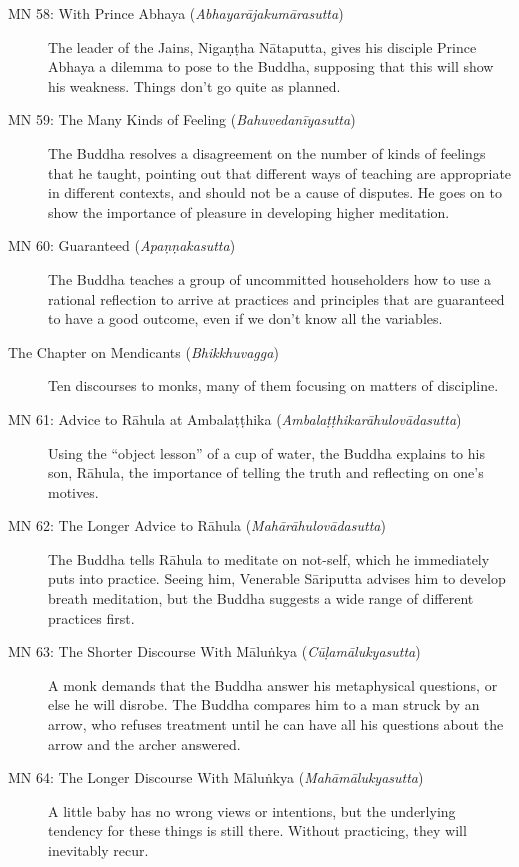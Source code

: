 \documentclass[12pt,openany]{book}%
\begin{document}
\begin{description}
\item[MN 58: With Prince Abhaya (\textit{\textsanskrit{Abhayarājakumārasutta}})] The leader of the Jains, \textsanskrit{Nigaṇṭha} \textsanskrit{Nātaputta}, gives his disciple Prince Abhaya a dilemma to pose to the Buddha, supposing that this will show his weakness. Things don’t go quite as planned.%
\item[MN 59: The Many Kinds of Feeling (\textit{\textsanskrit{Bahuvedanīyasutta}})] The Buddha resolves a disagreement on the number of kinds of feelings that he taught, pointing out that different ways of teaching are appropriate in different contexts, and should not be a cause of disputes. He goes on to show the importance of pleasure in developing higher meditation.%
\item[MN 60: Guaranteed (\textit{\textsanskrit{Apaṇṇakasutta}})] The Buddha teaches a group of uncommitted householders how to use a rational reflection to arrive at practices and principles that are guaranteed to have a good outcome, even if we don’t know all the variables.%
\item[The Chapter on Mendicants (\textit{\textsanskrit{Bhikkhuvagga}})] Ten discourses to monks, many of them focusing on matters of discipline.%
\item[MN 61: Advice to \textsanskrit{Rāhula} at \textsanskrit{Ambalaṭṭhika} (\textit{\textsanskrit{Ambalaṭṭhikarāhulovādasutta}})] Using the “object lesson” of a cup of water, the Buddha explains to his son, \textsanskrit{Rāhula}, the importance of telling the truth and reflecting on one’s motives.%
\item[MN 62: The Longer Advice to \textsanskrit{Rāhula} (\textit{\textsanskrit{Mahārāhulovādasutta}})] The Buddha tells \textsanskrit{Rāhula} to meditate on not-self, which he immediately puts into practice. Seeing him, Venerable \textsanskrit{Sāriputta} advises him to develop breath meditation, but the Buddha suggests a wide range of different practices first.%
\item[MN 63: The Shorter Discourse With \textsanskrit{Māluṅkya} (\textit{\textsanskrit{Cūḷamālukyasutta}})] A monk demands that the Buddha answer his metaphysical questions, or else he will disrobe. The Buddha compares him to a man struck by an arrow, who refuses treatment until he can have all his questions about the arrow and the archer answered.%
\item[MN 64: The Longer Discourse With \textsanskrit{Māluṅkya} (\textit{\textsanskrit{Mahāmālukyasutta}})] A little baby has no wrong views or intentions, but the underlying tendency for these things is still there. Without practicing, they will inevitably recur.%

\end{description}
\end{document}
